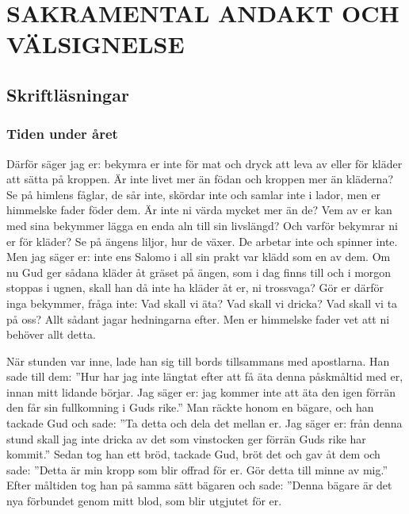 




\chapter{SAKRAMENTAL ANDAKT OCH VÄLSIGNELSE}



\section{Skriftläsningar}

\subsection{Tiden under året}


Därför säger jag er: bekymra er inte för mat och dryck att leva av eller för kläder att sätta på kroppen. Är inte livet mer än födan och kroppen mer än kläderna?
Se på himlens fåglar, de sår inte, skördar inte och samlar inte i lador, men er himmelske fader föder dem. Är inte ni värda mycket mer än de?
Vem av er kan med sina bekymmer lägga en enda aln till sin livslängd?
Och varför bekymrar ni er för kläder? Se på ängens liljor, hur de växer. De arbetar inte och spinner inte.
Men jag säger er: inte ens Salomo i all sin prakt var klädd som en av dem.
Om nu Gud ger sådana kläder åt gräset på ängen, som i dag finns till och i morgon stoppas i ugnen, skall han då inte ha kläder åt er, ni trossvaga?
Gör er därför inga bekymmer, fråga inte: Vad skall vi äta? Vad skall vi dricka? Vad skall vi ta på oss?
Allt sådant jagar hedningarna efter. Men er himmelske fader vet att ni behöver allt detta.


När stunden var inne, lade han sig till bords tillsammans med apostlarna.
Han sade till dem: ”Hur har jag inte längtat efter att få äta denna påskmåltid med er, innan mitt lidande börjar.
Jag säger er: jag kommer inte att äta den igen förrän den får sin fullkomning i Guds rike.”
Man räckte honom en bägare, och han tackade Gud och sade: ”Ta detta och dela det mellan er.
Jag säger er: från denna stund skall jag inte dricka av det som vinstocken ger förrän Guds rike har kommit.”
Sedan tog han ett bröd, tackade Gud, bröt det och gav åt dem och sade: ”Detta är min kropp som blir offrad för er. Gör detta till minne av mig.”
Efter måltiden tog han på samma sätt bägaren och sade: ”Denna bägare är det nya förbundet genom mitt blod, som blir utgjutet för er.

